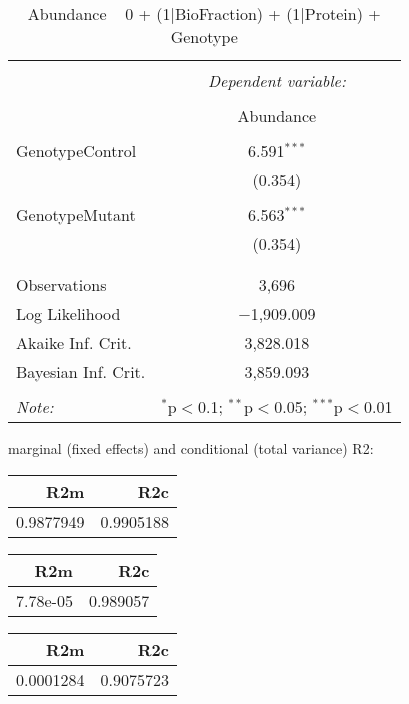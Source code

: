 \documentclass[11pt]{report}
\begin{document}
\begin{table}[!htbp] \centering 
  \caption{Abundance ~ 0 + (1|BioFraction) + (1|Protein) + Genotype} 
  \label{} 
\begin{tabular}{@{\extracolsep{5pt}}lc} 
\\[-1.8ex]\hline 
\hline \\[-1.8ex] 
 & \multicolumn{1}{c}{\textit{Dependent variable:}} \\ 
\cline{2-2} 
\\[-1.8ex] & Abundance \\ 
\hline \\[-1.8ex] 
 GenotypeControl & 6.591$^{***}$ \\ 
  & (0.354) \\ 
  & \\ 
 GenotypeMutant & 6.563$^{***}$ \\ 
  & (0.354) \\ 
  & \\ 
\hline \\[-1.8ex] 
Observations & 3,696 \\ 
Log Likelihood & $-$1,909.009 \\ 
Akaike Inf. Crit. & 3,828.018 \\ 
Bayesian Inf. Crit. & 3,859.093 \\ 
\hline 
\hline \\[-1.8ex] 
\textit{Note:}  & \multicolumn{1}{r}{$^{*}$p$<$0.1; $^{**}$p$<$0.05; $^{***}$p$<$0.01} \\ 
\end{tabular} 
\end{table} 
marginal (fixed effects) and conditional (total variance) R2:

\begin{tabular}{r|r}
\hline
R2m & R2c\\
\hline
0.9877949 & 0.9905188\\
\hline
\end{tabular}

\begin{tabular}{r|r}
\hline
R2m & R2c\\
\hline
7.78e-05 & 0.989057\\
\hline
\end{tabular}

\begin{tabular}{r|r}
\hline
R2m & R2c\\
\hline
0.0001284 & 0.9075723\\
\hline
\end{tabular}
\end{document}
